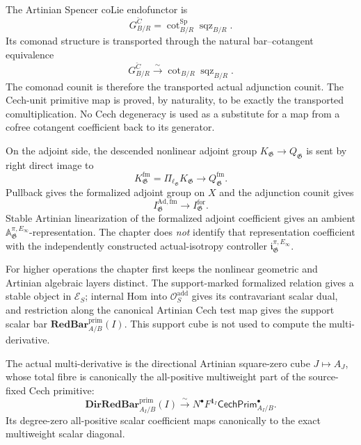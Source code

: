 The Artinian Spencer coLie endofunctor is
\[
    G^{\check C}_{B/R}
    =
    \operatorname{cot}^{\mathrm{Sp}}_{B/R}
    \operatorname{sqz}_{B/R}.
\]
Its comonad structure is transported through the natural bar--cotangent
equivalence
\[
    G^{\check C}_{B/R}
    \xrightarrow{\sim}
    \operatorname{cot}_{B/R}\operatorname{sqz}_{B/R}.
\]
The comonad counit is therefore the transported actual adjunction counit.  The
Cech-unit primitive map is proved, by naturality, to be exactly the transported
comultiplication.  No Cech degeneracy is used as a substitute for a map from a
cofree cotangent coefficient back to its generator.

On the adjoint side, the descended nonlinear adjoint group
$K_{\mathfrak G}\to Q_{\mathfrak G}$ is sent by right direct image to
\[
    K_{\mathfrak G}^{\mathrm{fm}}
    =
    \Pi_{\ell_{\mathfrak G}}K_{\mathfrak G}
    \longrightarrow
    Q_{\mathfrak G}^{\mathrm{fm}}.
\]
Pullback gives the formalized adjoint group on $X$ and the adjunction counit
gives
\[
    I_{\mathfrak G}^{\mathrm{Ad,fm}}
    \longrightarrow
    I_{\mathfrak G}^{\mathrm{for}}.
\]
Stable Artinian linearization of the formalized adjoint coefficient gives an
ambient $\mathbb A_{\mathfrak G}^{\pi,E_\infty}$-representation.  The chapter
does \emph{not} identify that representation coefficient with the independently
constructed actual-isotropy controller
$\mathfrak i_{\mathfrak G}^{\pi,E_\infty}$.

For higher operations the chapter first keeps the nonlinear geometric and
Artinian algebraic layers distinct.  The support-marked formalized relation
gives a stable object in $\mathcal E_S$; internal Hom into
$\mathcal O_S^{\mathrm{add}}$ gives its contravariant scalar dual, and
restriction along the canonical Artinian Cech test map gives the support
scalar bar $\mathbf{RedBar}^{\mathrm{prim}}_{A/B}(I)$.  This support cube is
not used to compute the multi-derivative.

The actual multi-derivative is the directional Artinian square-zero cube
$J\mapsto A_J$, whose total fibre is canonically the all-positive multiweight
part of the source-fixed Cech primitive:
\[
    \mathbf{DirRedBar}^{\mathrm{prim}}_{A_I/B}(I)
    \xrightarrow{\sim}
    N^\bullet F^{\mathbf1_I}\mathsf{CechPrim}_{A_I/B}^{\bullet}.
\]
Its degree-zero all-positive scalar coefficient maps canonically to the exact
multiweight scalar diagonal.


